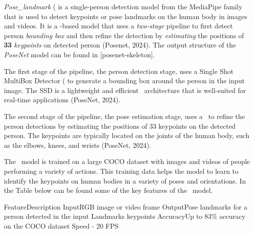 {\em Pose_landmark} (\PoseNet\) is a single-person detection model from the MediaPipe family that is used to detect keypoints or pose landmarks on the human body in images and videos. It is a \CNN\--based model that uses a {\em two-stage} pipeline to first detect person {\em bounding box} and then refine the detection by {\em estimating} the positions of {\bf 33} {\em keypoints} on detected person (\scc Posenet, 2024). The output structure of the {\em PoseNet} model can be found in [posenet-skeleton].

The first stage of the pipeline, the person detection stage, uses a Single Shot MultiBox Detector (\SSD\) to generate a bounding box around the person in the input image. The SSD is a lightweight and efficient \CNN\ architecture that is well-suited for real-time applications (\scc PoseNet, 2024).

The second stage of the pipeline, the pose estimation stage, uses a \CNN\ to refine the person detections by estimating the positions of 33 keypoints on the detected person. The keypoints are typically located on the joints of the human body, such as the elbows, knees, and wrists (\scc PoseNet, 2024).

The \PoseNet\ model is trained on a large COCO dataset with images and videos of people performing a variety of actions. This training data helps the model to learn to identify the keypoints on human bodies in a variety of poses and orientations. In the Table below can be found some of the key features of the \PoseNet\ model.

    \setupTABLE[r][1][style=bold]
    \setupTABLE[c][each][offset=3dd]
    \setupTABLE[frame=off]
    \setupTABLE[r][1][topframe=on,bottomframe=on]
    \setupTABLE[c][each][leftframe=on]
    \setupTABLE[c][1][leftframe=off]
    \bTR
        \bTD Feature\eTD\bTD    Description\eTD\eTR
    \bTR
        \bTD Input\eTD\bTD      RGB image or video frame\eTD\eTR
    \bTR
            \bTD Output\eTD\bTD     Pose landmarks for a person detected in the input\eTD\eTR
    \bTR
        \bTD Landmarks\eTD{} keypoints\eTD\eTR
    \bTR
        \bTD Accuracy\eTD\bTD   Up to 83\% accuracy on the COCO dataset\eTD\eTR
    \bTR
        \bTD Speed\eTD{} - 20 FPS\eTD\eTR


